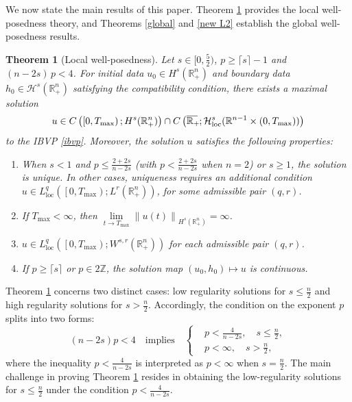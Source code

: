 \documentclass[preprint,compress,12pt]{elsarticle}
\newtheorem{theorem}{Theorem}[section]
\numberwithin{equation}{section}
\begin{document}
We now state the main results of this paper. Theorem \ref{chaste} provides the local well-posedness theory, and Theorems \ref{global} and \ref{new L2} establish the global well-posedness results.
\begin{theorem}[Local well-posedness]\label{chaste}
	Let $s\in [0,\frac{5}{2})$, $p\geq \lceil s\rceil-1$ and $(n-2s)\,p<4$. For initial data $u_{0}\in H^{s}(\mathbb{R}^{n}_{+})$ and boundary data $h_{0}\in\mathcal{H}^{s}(\mathbb{R}_{+}^{n})$  satisfying the compatibility condition, there exists a maximal solution
	\begin{equation}\label{tarnish}
		u\in C\left(\left[0,T_{\max}\right);H^{s}(\mathbb{R}^{n}_{+})\right)\cap C\left(\overline{\mathbb{R}_{+}\mkern-4mu}\,;\mathcal{H}^{s}_{\mathrm{loc}}(\mathbb{R}^{n-1}\times(0,T_{\max}))\right)
	\end{equation}
	to the IBVP \eqref{ibvp}. Moreover, the solution $u$ satisfies the following properties:
	\begin{enumerate}[label=(\roman*)]
		\item When $s < 1$ and $p \leq \frac{2+2s}{n-2s}$ (with $p < \frac{2+2s}{n-2s}$ when $n = 2$) or $s \geq 1$, the solution is unique. In other cases, uniqueness requires an additional condition $u\in L_{\mathrm{loc}}^{q}\left(\left[0,T_{\max}\right);L^{r}(\mathbb{R}^{n}_{+})\right)$, for some admissible pair $(q,r)$.
		\item If $T_{\max}< \infty$, then $\lim\limits_{t\rightarrow T_{\max}} \left\|u(t)\right\|_{H^{s}(\mathbb{R}^{n}_{+})}=\infty$.
		\item $u\in L_{\mathrm{loc}}^{q}\left(\left[0,T_{\max}\right);W^{s,r}(\mathbb{R}^{n}_{+})\right)$ for each admissible pair $(q,r)$.
		\item If $p\geq \lceil s\rceil$ or $p\in2\mathbb{Z}$, the solution map $\left(u_{0},h_{0}\right)\mapsto u $ is continuous.
	\end{enumerate}
\end{theorem}
Theorem \ref{chaste} concerns two distinct cases:  low regularity solutions for $s\leq\frac{n}{2}$ and high regularity solutions for $s>\frac{n}{2}$. Accordingly, the condition on the exponent $p$ splits into two forms:
\begin{equation}
	(n-2s)p<4 \quad  \text{implies} \quad \left\{
	\begin{aligned}
		&p<\tfrac{4}{n-2s},\quad  s\leq\tfrac{n}{2},\\
		&p<\infty,\quad  s>\tfrac{n}{2},
	\end{aligned}
	\right.
\end{equation}
where the inequality  $p<\frac{4}{n-2s}$ is
interpreted as $p<\infty$ when $s=\frac{n}{2}$.  The main challenge in proving Theorem \ref{chaste} resides in obtaining the low-regularity solutions for $s\leq\frac{n}{2}$ under the condition $p<\frac{4}{n-2s}$.
\end{document}
